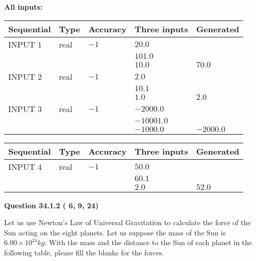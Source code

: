 \documentclass[12pt]{article}
\begin{document}
   
   
   
\noindent\vspace{0.1in}\hspace{-0.08in} {\textbf{\Large{All inputs: }}}
   
   
  
  
\noindent\begin{tabular}{|l|l|l|l|l|}
\hline
 Sequential & Type & Accuracy & Three inputs & Generated \\ 
\hline
 
 
  INPUT $           1$ & real & $          -1 $ & $
 20.0
  $ & \\
  & & &  $
 101.0
  $ & \\
  & & &  $
 10.0
 $ & $ 70.0 $ 
 \\  \hline  
 
 
  INPUT $           2$ & real & $          -1 $ & $
 2.0
  $ & \\
  & & &  $
 10.1
  $ & \\
  & & &  $
 1.0
 $ & $ 2.0 $ 
 \\  \hline  
 
 
  INPUT $           3$ & real & $          -1 $ & $
 -2000.0
  $ & \\
  & & &  $
 -10001.0
  $ & \\
  & & &  $
 -1000.0
 $ & $ -2000.0 $ 
 \\  \hline  
 \end{tabular}
   
   
  
  
\noindent\begin{tabular}{|l|l|l|l|l|}
\hline
 Sequential & Type & Accuracy & Three inputs & Generated \\ 
\hline
 
 
  INPUT $           4$ & real & $          -1 $ & $
 50.0
  $ & \\
  & & &  $
 60.1
  $ & \\
  & & &  $
 2.0
 $ & $ 52.0 $ 
 \\  \hline  
 \end{tabular}
   
   
  
\vspace{0.2in}
  
{\textbf{\Large{Question
34.1.2 
 (          6,          9,         24)
}}}
  
  
Let us use Newton's Law of Universal Gravitation to calculate the force
of the Sun acting on the eight planets. Let us suppose the mass of the
Sun is $ %
6.00 \times 10^{24} kg$. With the mass and the
distance to the Sun of each planet in the following table, please fill
the blanks for the forces.
 
\end{document}
